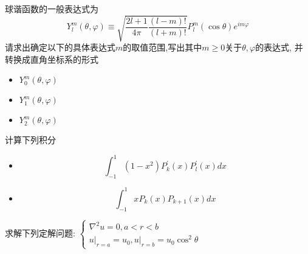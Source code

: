 \documentclass[10pt]{article}
\newenvironment{problem}[2][]{\begin{trivlist}
\item[\hskip \labelsep {\bfseries #1}\hskip \labelsep {\bfseries #2}]}{\end{trivlist}}
\begin{document}
\begin{problem}{9.4}
球谐函数的一般表达式为
$$
Y_l^m(\theta, \varphi) \equiv \sqrt{\frac{2 l+1}{4 \pi} \frac{(l-m) !}{(l+m) !}} P_l^m(\cos \theta) e^{i m \varphi}
$$
请求出确定以下的具体表达式$m$的取值范围,写出其中$m\geq 0$关于$\theta,\varphi$的表达式, 并转换成直角坐标系的形式
\begin{itemize}
  \item[(1)] $Y_0^m(\theta,\varphi)$
  \item[(2)] $Y_1^m(\theta,\varphi)$
  \item[(3)] $Y_2^m(\theta,\varphi)$
\end{itemize}

\end{problem}



\begin{problem}{9.5}
计算下列积分
\begin{itemize}
  \item[(1)] $$
  \int_{-1}^1\left(1-x^2\right) P_k^{\prime}(x) P_l^{\prime}(x) d x
  $$
  \item[(2)]
  $$
\int_{-1}^1 x P_k(x) P_{k+1}(x) d x
$$
\end{itemize}

\end{problem}



\begin{problem}{9.6}

  求解下列定解问题: 
  $\left\{\begin{array}{l}
    \nabla^2 u=0, a<r<b \\ 
    \left.u\right|_{r=a}=u_0,\left.u\right|_{r=b}=u_0 \cos ^2 \theta
  \end{array}\right.$
\end{problem} 
\end{document}
